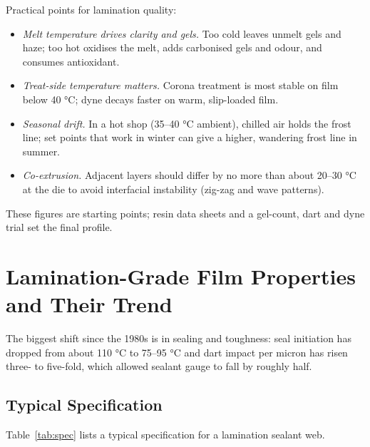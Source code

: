 \documentclass[10pt,twocolumn,a4paper]{article}
\begin{document}
Practical points for lamination quality:
\begin{itemize}\setlength\itemsep{1pt}
\item \textit{Melt temperature drives clarity and gels.} Too cold leaves unmelt gels and haze; too hot oxidises the melt, adds carbonised gels and odour, and consumes antioxidant.
\item \textit{Treat-side temperature matters.} Corona treatment is most stable on film below 40 °C; dyne decays faster on warm, slip-loaded film.
\item \textit{Seasonal drift.} In a hot shop (35–40 °C ambient), chilled air holds the frost line; set points that work in winter can give a higher, wandering frost line in summer.
\item \textit{Co-extrusion.} Adjacent layers should differ by no more than about 20–30 °C at the die to avoid interfacial instability (zig-zag and wave patterns).
\end{itemize}
These figures are starting points; resin data sheets and a gel-count, dart and dyne trial set the final profile.

\section{Lamination-Grade Film Properties and Their Trend}

The biggest shift since the 1980s is in sealing and toughness: seal initiation has dropped from about 110 °C to 75–95 °C and dart impact per micron has risen three- to five-fold, which allowed sealant gauge to fall by roughly half.

\subsection{Typical Specification}

Table~\ref{tab:spec} lists a typical specification for a lamination sealant web.
\end{document}
